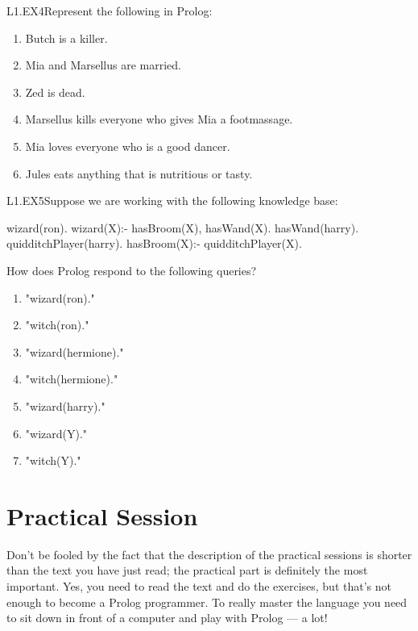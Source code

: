 \begin{LPNexercise}{L1.EX4}Represent the following in Prolog:

\begin{enumerate}
\item{}Butch is a killer.
\item{}Mia and Marsellus are married.
\item{}Zed is dead.
\item{}Marsellus kills everyone who gives Mia a footmassage.
\item{}Mia loves everyone who is a good dancer.
\item{}Jules eats anything that is nutritious or tasty.
\end{enumerate}
\end{LPNexercise}

\begin{LPNexercise}{L1.EX5}Suppose we are working with the following knowledge base:

\begin{LPNcodedisplay}
wizard(ron).
wizard(X):- hasBroom(X), hasWand(X).
hasWand(harry).
quidditchPlayer(harry).
hasBroom(X):- quidditchPlayer(X).
\end{LPNcodedisplay}


How does Prolog respond to the following queries?
\begin{enumerate}
\item{}"wizard(ron)."
\item{}"witch(ron)."
\item{}"wizard(hermione)."
\item{}"witch(hermione)."
\item{}"wizard(harry)."
\item{}"wizard(Y)."
\item{}"witch(Y)."
\end{enumerate}
\end{LPNexercise}



\section{Practical Session}\label{SEC.L1.PRAXIS}

Don't be fooled by the fact that the description of the practical
sessions is shorter than the text you have just read; the practical
part is definitely the most important. Yes, you need to read the text
and do the exercises, but that's not enough to become a Prolog
programmer. To really master the language you need to sit down in
front of a computer and play with Prolog --- a lot!

